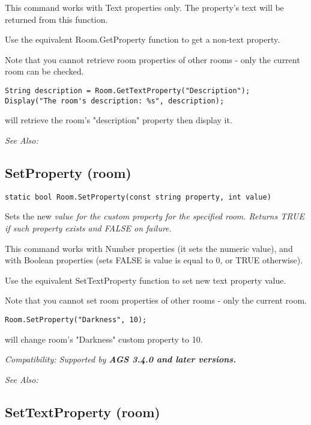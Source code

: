 This command works with Text properties only. The property's text will be
returned from this function.

Use the equivalent Room.GetProperty function to get a non-text property.

Note that you cannot retrieve room properties of other rooms - only the current room
can be checked.

\begin{verbatim}
String description = Room.GetTextProperty("Description");
Display("The room's description: %s", description);
\end{verbatim}
will retrieve the room's "description" property then display it.

\it{See Also:} 


\subsection{SetProperty (room)}\label{Room.SetProperty}%

\begin{verbatim}
static bool Room.SetProperty(const string property, int value)
\end{verbatim}
Sets the new \it{value} for the custom \it{property} for the specified room. Returns
TRUE if such property exists and FALSE on failure.

This command works with Number properties (it sets the numeric value), and with Boolean
properties (sets FALSE is value is equal to 0, or TRUE otherwise).

Use the equivalent SetTextProperty function to set new text property value.

Note that you cannot set room properties of other rooms - only the current room.

\begin{verbatim}
Room.SetProperty("Darkness", 10);
\end{verbatim}
will change room's "Darkness" custom property to 10.

\it{Compatibility:} Supported by \bf{AGS 3.4.0} and later versions.

\it{See Also:} 


\subsection{SetTextProperty (room)}\label{Room.SetTextProperty}%

